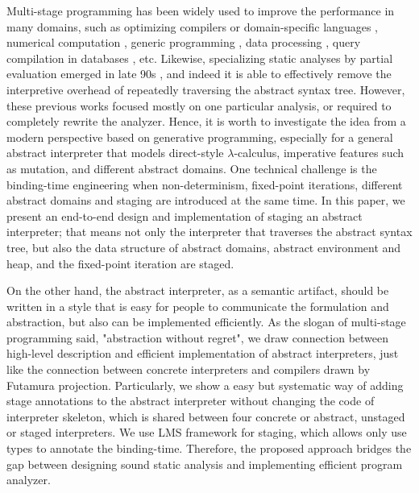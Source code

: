 Multi-stage programming has been widely used to improve the performance in many domains, 
such as optimizing compilers or domain-specific languages \cite{DBLP:conf/pldi/RompfSBLCO14, DBLP:conf/snapl/RompfBLSJAOSKDK15,
DBLP:journals/tecs/SujeethBLRCOO14, DBLP:conf/gpce/SujeethGBLROO13, DBLP:journals/jfp/CaretteKS09},
numerical computation \cite{PGL-038, DBLP:conf/pepm/AktemurKKS13}, 
generic programming \cite{DBLP:journals/pacmpl/Yallop17, Ofenbeck:2017:SGP:3136040.3136060}, 
data processing \cite{DBLP:conf/oopsla/JonnalageddaCSRO14, DBLP:conf/popl/KiselyovBPS17}, 
query compilation in databases \cite{DBLP:conf/osdi/EssertelTDBOR18, DBLP:conf/sigmod/TahboubER18},
etc.
Likewise, specializing static analyses by partial evaluation emerged in late 90s 
\cite{damian1999partial, amtoft1999partial, Boucher:1996:ACN:647473.727587, ashley:practical}, 
and indeed it is able to effectively remove the interpretive overhead of repeatedly traversing 
the abstract syntax tree. 
However, these previous works focused mostly on one particular analysis, or required to 
completely rewrite the analyzer. 
Hence, it is worth to investigate the idea from a modern perspective based on generative programming,
especially for a general abstract interpreter that models direct-style $\lambda$-calculus, imperative 
features such as mutation, and different abstract domains.
One technical challenge is the binding-time engineering when non-determinism, 
fixed-point iterations, different abstract domains and staging are introduced at the same time.
In this paper, we present an end-to-end design and implementation of staging an abstract interpreter;
that means not only the interpreter that traverses the abstract syntax tree, 
but also the data structure of abstract domains, abstract environment and heap, 
and the fixed-point iteration are staged.

On the other hand, the abstract interpreter, as a semantic artifact, should be written in a 
style that is easy for people to communicate the formulation and abstraction, but also can be 
implemented efficiently. As the slogan of multi-stage programming said, "abstraction without regret",
we draw connection between high-level description and efficient implementation of abstract interpreters,
just like the connection between concrete interpreters and compilers drawn by Futamura projection.
Particularly, we show a easy but systematic way of adding stage annotations to the abstract interpreter
without changing the code of interpreter skeleton, which is shared between four concrete or abstract,
unstaged or staged interpreters. We use LMS framework for staging, which allows only use types to 
annotate the binding-time. Therefore, the proposed approach bridges the gap between designing sound 
static analysis and implementing efficient program analyzer.

